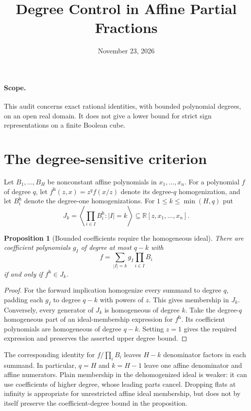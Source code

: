 \documentclass[11pt]{article}
\title{Degree Control in Affine Partial Fractions}
\author{}
\date{November 23, 2026}
\newtheorem{proposition}{Proposition}
\begin{document}
\maketitle

\paragraph{Scope.}
This audit concerns exact rational identities, with bounded polynomial
degrees, on an open real domain. It does not give a lower bound for
strict sign representations on a finite Boolean cube.

\section{The degree-sensitive criterion}

Let $B_1,\ldots,B_H$ be nonconstant affine polynomials in $x_1,\ldots,x_n$.
For a polynomial $f$ of degree $q$, let
$f^{\mathrm h}(z,x)=z^q f(x/z)$ denote its degree-$q$ homogenization,
and let $B_i^{\mathrm h}$ denote the degree-one homogenizations.
For $1\le k\le \min(H,q)$ put
\[
 J_k=\left\langle\prod_{i\in I}B_i^{\mathrm h}:|I|=k\right\rangle
 \subseteq\mathbb R[z,x_1,\ldots,x_n].
\]

\begin{proposition}[Bounded coefficients require the homogeneous ideal]
There are coefficient polynomials $g_I$ of degree at most $q-k$ with
\[
 f=\sum_{|I|=k}g_I\prod_{i\in I}B_i
\]
if and only if $f^{\mathrm h}\in J_k$.
\end{proposition}
\begin{proof}
For the forward implication homogenize every summand to degree $q$,
padding each $g_I$ to degree $q-k$ with powers of $z$. This gives
membership in $J_k$. Conversely, every generator of $J_k$ is
homogeneous of degree $k$. Take the degree-$q$ homogeneous part of an
ideal-membership expression for $f^{\mathrm h}$. Its coefficient
polynomials are homogeneous of degree $q-k$. Setting $z=1$ gives the
required expression and preserves the asserted upper degree bound.
\end{proof}

The corresponding identity for $f/\prod_i B_i$ leaves $H-k$
denominator factors in each summand. In particular, $q=H$ and $k=H-1$
leave one affine denominator and affine numerators. Plain membership
in the dehomogenized ideal is weaker: it can use coefficients of
higher degree, whose leading parts cancel. Dropping flats at infinity
is appropriate for unrestricted affine ideal membership, but does not
by itself preserve the coefficient-degree bound in the proposition.
\end{document}
